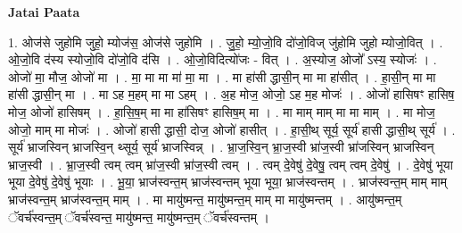 \documentclass[17pt]{extarticle}
\begin{document}
\textbf{Jatai Paata} \newline

1. ओज॑से जुहोमि जुहो॒ म्योज॑स॒ ओज॑से जुहोमि । . जु॒हो॒ म्यो॒जो॒वि दो॑जो॒विज् जु॑होमि जुहो म्योजो॒वित् । . ओ॒जो॒वि द॑स्य स्योजो॒वि दो॑जो॒वि द॑सि । . ओ॒जो॒विदित्यो॑जः - वित् । . अ॒स्योज॒ ओजो᳚ ऽस्य॒ स्योजः॑ । . ओजो॑ मा॒ मौज॒ ओजो॑ मा । . मा॒ मा मा मा॑ मा॒ मा । . मा हा॑सी द्धासी॒न् मा मा हा॑सीत् । . हा॒सी॒न् मा मा हा॑सी द्धासी॒न् मा । . मा ऽह म॒हम् मा मा ऽहम् । . अ॒ह मोज॒ ओजो॒ ऽह म॒ह मोजः॑ । . ओजो॑ हासिषꣳ हासिष॒ मोज॒ ओजो॑ हासिषम् । . हा॒सि॒ष॒म् मा मा हा॑सिषꣳ हासिष॒म् मा । . मा माम् माम् मा मा माम् । . मा मोज॒ ओजो॒ माम् मा मोजः॑ । . ओजो॑ हासी द्धासी॒ दोज॒ ओजो॑ हासीत् । . हा॒सी॒थ् सूर्य॒ सूर्य॑ हासी द्धासी॒थ् सूर्य॑ । . सूर्य॑ भ्राजस्विन् भ्राजस्वि॒न् थ्सूर्य॒ सूर्य॑ भ्राजस्विन्न् । . भ्रा॒ज॒स्वि॒न् भ्रा॒ज॒स्वी भ्रा॑ज॒स्वी भ्रा॑जस्विन् भ्राजस्विन् भ्राज॒स्वी । . भ्रा॒ज॒स्वी त्वम् त्वम् भ्रा॑ज॒स्वी भ्रा॑ज॒स्वी त्वम् । . त्वम् दे॒वेषु॑ दे॒वेषु॒ त्वम् त्वम् दे॒वेषु॑ । . दे॒वेषु॑ भूया भूया दे॒वेषु॑ दे॒वेषु॑ भूयाः । . भू॒या॒ भ्राज॑स्वन्त॒म् भ्राज॑स्वन्तम् भूया भूया॒ भ्राज॑स्वन्तम् । . भ्राज॑स्वन्त॒म् माम् माम् भ्राज॑स्वन्त॒म् भ्राज॑स्वन्त॒म् माम् । . मा मायु॑ष्मन्त॒ मायु॑ष्मन्त॒म् माम् मा मायु॑ष्मन्तम् । . आयु॑ष्मन्त॒म् ॅवर्च॑स्वन्त॒म् ॅवर्च॑स्वन्त॒ मायु॑ष्मन्त॒ मायु॑ष्मन्त॒म् ॅवर्च॑स्वन्तम् । \newline
\end{document}

